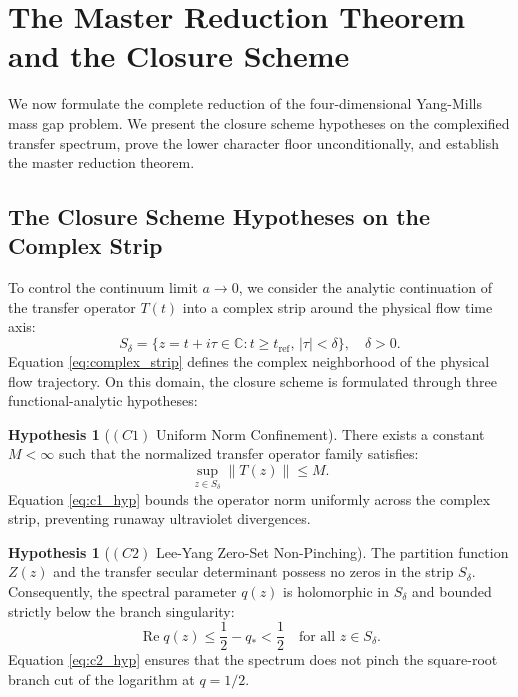 \documentclass[11pt,reqno]{amsart}
\theoremstyle{plain}
\theoremstyle{definition}
\newtheorem{hypothesis}[theorem]{Hypothesis}
\theoremstyle{remark}
\numberwithin{equation}{section}
\begin{document}
\section{The Master Reduction Theorem and the Closure Scheme}

We now formulate the complete reduction of the four-dimensional Yang-Mills mass gap problem. We present the closure scheme hypotheses on the complexified transfer spectrum, prove the lower character floor unconditionally, and establish the master reduction theorem.

\subsection{The Closure Scheme Hypotheses on the Complex Strip}
To control the continuum limit $a \to 0$, we consider the analytic continuation of the transfer operator $T(t)$ into a complex strip around the physical flow time axis:
\begin{equation}
\label{eq:complex_strip}
S_\delta = \{ z = t + i \tau \in \mathbb{C} : t \ge t_{\mathrm{ref}}, \, |\tau| < \delta \}, \quad \delta > 0.
\end{equation}
Equation \eqref{eq:complex_strip} defines the complex neighborhood of the physical flow trajectory. On this domain, the closure scheme is formulated through three functional-analytic hypotheses:

\begin{hypothesis}[$(C1)$ Uniform Norm Confinement]
There exists a constant $M < \infty$ such that the normalized transfer operator family satisfies:
\begin{equation}
\label{eq:c1_hyp}
\sup_{z \in S_\delta} \| T(z) \| \le M.
\end{equation}
Equation \eqref{eq:c1_hyp} bounds the operator norm uniformly across the complex strip, preventing runaway ultraviolet divergences.
\end{hypothesis}

\begin{hypothesis}[$(C2)$ Lee-Yang Zero-Set Non-Pinching]
The partition function $Z(z)$ and the transfer secular determinant possess no zeros in the strip $S_\delta$. Consequently, the spectral parameter $q(z)$ is holomorphic in $S_\delta$ and bounded strictly below the branch singularity:
\begin{equation}
\label{eq:c2_hyp}
\operatorname{Re} q(z) \le \frac{1}{2} - q_* < \frac{1}{2} \quad \text{for all } z \in S_\delta.
\end{equation}
Equation \eqref{eq:c2_hyp} ensures that the spectrum does not pinch the square-root branch cut of the logarithm at $q = 1/2$.
\end{hypothesis}
\end{document}
